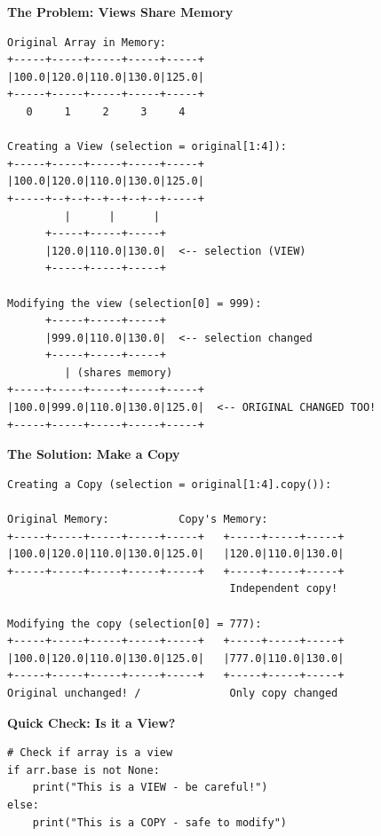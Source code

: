\begin{tcolorbox}[
    title=Views vs Copies Illustrated,
    colframe=red,
    colback = white,
    arc=2mm
]
\textbf{The Problem: Views Share Memory}
\begin{lstlisting}[basicstyle=\ttfamily\footnotesize,breaklines=true,columns=fullflexible,keepspaces=true,xleftmargin=0pt]
Original Array in Memory:
+-----+-----+-----+-----+-----+
|100.0|120.0|110.0|130.0|125.0|
+-----+-----+-----+-----+-----+
   0     1     2     3     4

Creating a View (selection = original[1:4]):
+-----+-----+-----+-----+-----+
|100.0|120.0|110.0|130.0|125.0|
+-----+--+--+--+--+--+--+-----+
         |      |      |
      +-----+-----+-----+
      |120.0|110.0|130.0|  <-- selection (VIEW)
      +-----+-----+-----+
      
Modifying the view (selection[0] = 999):
      +-----+-----+-----+
      |999.0|110.0|130.0|  <-- selection changed
      +-----+-----+-----+
         | (shares memory)
+-----+-----+-----+-----+-----+
|100.0|999.0|110.0|130.0|125.0|  <-- ORIGINAL CHANGED TOO!
+-----+-----+-----+-----+-----+

\end{lstlisting}

\textbf{The Solution: Make a Copy}
\begin{lstlisting}[basicstyle=\ttfamily\footnotesize,breaklines=true,columns=fullflexible,keepspaces=true,xleftmargin=0pt]
Creating a Copy (selection = original[1:4].copy()):

Original Memory:           Copy's Memory:
+-----+-----+-----+-----+-----+   +-----+-----+-----+
|100.0|120.0|110.0|130.0|125.0|   |120.0|110.0|130.0|
+-----+-----+-----+-----+-----+   +-----+-----+-----+
                                   Independent copy!

Modifying the copy (selection[0] = 777):
+-----+-----+-----+-----+-----+   +-----+-----+-----+
|100.0|120.0|110.0|130.0|125.0|   |777.0|110.0|130.0|
+-----+-----+-----+-----+-----+   +-----+-----+-----+
Original unchanged! /              Only copy changed

\end{lstlisting}

\textbf{Quick Check: Is it a View?}
\begin{lstlisting}[basicstyle=\ttfamily\footnotesize,breaklines=true,columns=fullflexible,keepspaces=true,xleftmargin=0pt]
# Check if array is a view
if arr.base is not None:
    print("This is a VIEW - be careful!")
else:
    print("This is a COPY - safe to modify")

\end{lstlisting}
\end{tcolorbox}

